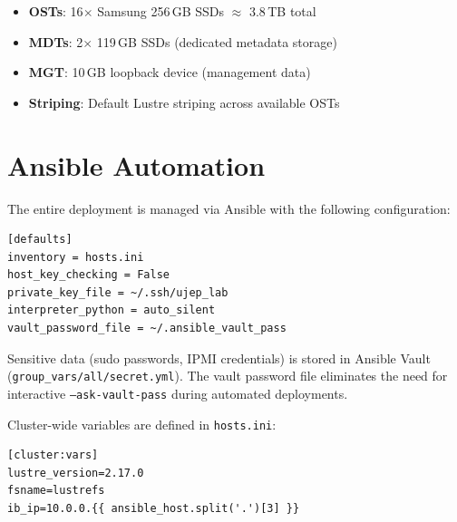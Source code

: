 \begin{itemize}
    \item \textbf{OSTs}: 16$\times$ Samsung 256\,GB SSDs $\approx$ 3.8\,TB total
    \item \textbf{MDTs}: 2$\times$ 119\,GB SSDs (dedicated metadata storage)
    \item \textbf{MGT}: 10\,GB loopback device (management data)
    \item \textbf{Striping}: Default Lustre striping across available OSTs
\end{itemize}

\section{Ansible Automation}

The entire deployment is managed via Ansible with the following configuration:

\begin{verbatim}
[defaults]
inventory = hosts.ini
host_key_checking = False
private_key_file = ~/.ssh/ujep_lab
interpreter_python = auto_silent
vault_password_file = ~/.ansible_vault_pass
\end{verbatim}

Sensitive data (sudo passwords, IPMI credentials) is stored in Ansible Vault (\texttt{group\_vars/all/secret.yml}). The vault password file eliminates the need for interactive \texttt{--ask-vault-pass} during automated deployments.

Cluster-wide variables are defined in \texttt{hosts.ini}:

\begin{verbatim}
[cluster:vars]
lustre_version=2.17.0
fsname=lustrefs
ib_ip=10.0.0.{{ ansible_host.split('.')[3] }}
\end{verbatim}
